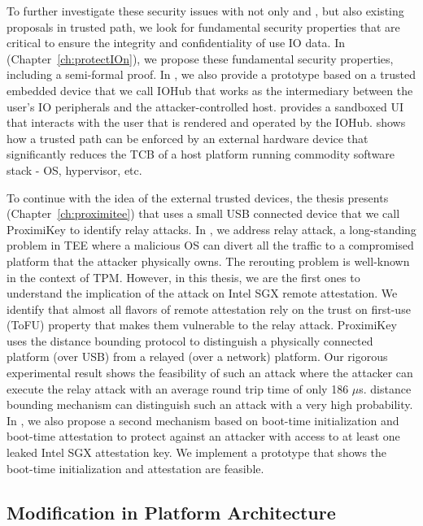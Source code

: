 To further investigate these security issues with not only \integrikey and \integriscreen, but also existing proposals in trusted path, we look for fundamental security properties that are critical to ensure the integrity and confidentiality of use IO data. In \protection (Chapter~\ref{ch:protectIOn}), we propose these fundamental security properties, including a semi-formal proof. In \protection, we also provide a prototype based on a trusted embedded device that we call IOHub that works as the intermediary between the user's IO peripherals and the attacker-controlled host. \protection provides a sandboxed UI that interacts with the user that is rendered and operated by the IOHub. \protection shows how a trusted path can be enforced by an external hardware device that significantly reduces the TCB of a host platform running commodity software stack - OS, hypervisor, etc.

To continue with the idea of the external trusted devices, the thesis presents \proximitee (Chapter~\ref{ch:proximitee}) that uses a small USB connected device that we call ProximiKey to identify relay attacks. In \proximitee, we address relay attack, a long-standing problem in TEE where a malicious OS can divert all the traffic to a compromised platform that the attacker physically owns. The rerouting problem is well-known in the context of TPM. However, in this thesis, we are the first ones to understand the implication of the attack on Intel SGX remote attestation. We identify that almost all flavors of remote attestation rely on the trust on first-use (ToFU) property that makes them vulnerable to the relay attack. ProximiKey uses the distance bounding protocol to distinguish a physically connected platform (over USB) from a relayed (over a network) platform. Our rigorous experimental result shows the feasibility of such an attack where the attacker can execute the relay attack with an average round trip time of only 186 $\mu$s. \proximitee distance bounding mechanism can distinguish such an attack with a very high probability. In \proximitee, we also propose a second mechanism based on boot-time initialization and boot-time attestation to protect against an attacker with access to at least one leaked Intel SGX attestation key. We implement a prototype that shows the boot-time initialization and attestation are feasible. 


\subsection{Modification in Platform Architecture}

